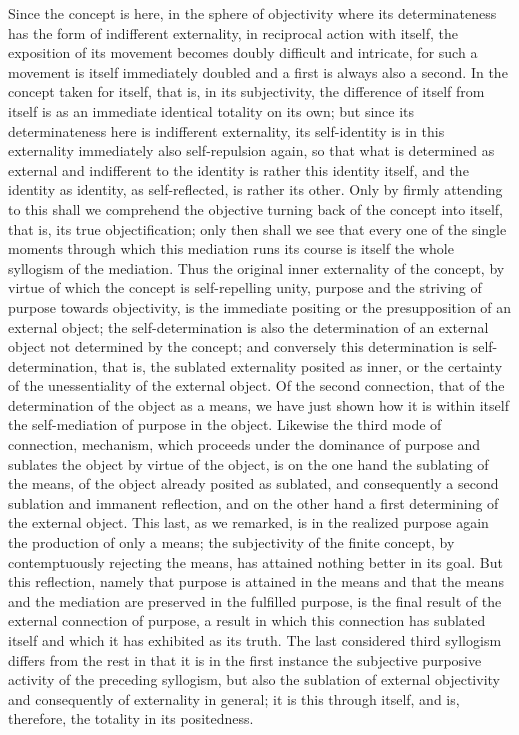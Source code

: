 Since the concept is here,
in the sphere of objectivity
where its determinateness has
the form of indifferent externality,
in reciprocal action with itself,
the exposition of its movement
becomes doubly difficult and intricate,
for such a movement is itself immediately doubled
and a first is always also a second.
In the concept taken for itself,
that is, in its subjectivity,
the difference of itself from itself is
as an immediate identical totality on its own;
but since its determinateness here is indifferent externality,
its self-identity is in this externality
immediately also self-repulsion again,
so that what is determined as external
and indifferent to the identity is
rather this identity itself,
and the identity as identity,
as self-reflected,
is rather its other.
Only by firmly attending to this
shall we comprehend the objective
turning back of the concept into itself,
that is, its true objectification;
only then shall we see that
every one of the single moments
through which this mediation runs its course is
itself the whole syllogism of the mediation.
Thus the original inner externality of the concept,
by virtue of which the concept is
self-repelling unity, purpose
and the striving of purpose towards objectivity,
is the immediate positing
or the presupposition of an external object;
the self-determination is also
the determination of an external
object not determined by the concept;
and conversely this determination
is self-determination, that is,
the sublated externality posited as inner,
or the certainty of the unessentiality
of the external object.
Of the second connection,
that of the determination of the object as a means,
we have just shown how it is within itself
the self-mediation of purpose in the object.
Likewise the third mode of connection, mechanism,
which proceeds under the dominance of purpose
and sublates the object by virtue of the object,
is on the one hand the sublating of the means,
of the object already posited as sublated,
and consequently a second sublation
and immanent reflection,
and on the other hand a first
determining of the external object.
This last, as we remarked,
is in the realized purpose
again the production of only a means;
the subjectivity of the finite concept,
by contemptuously rejecting the means,
has attained nothing better in its goal.
But this reflection, namely
that purpose is attained in the means
and that the means and the mediation are
preserved in the fulfilled purpose,
is the final result of
the external connection of purpose,
a result in which this connection has sublated itself
and which it has exhibited as its truth.
The last considered third syllogism differs from the rest
in that it is in the first instance
the subjective purposive activity of the preceding syllogism,
but also the sublation of external objectivity
and consequently of externality in general;
it is this through itself, and is, therefore,
the totality in its positedness.

